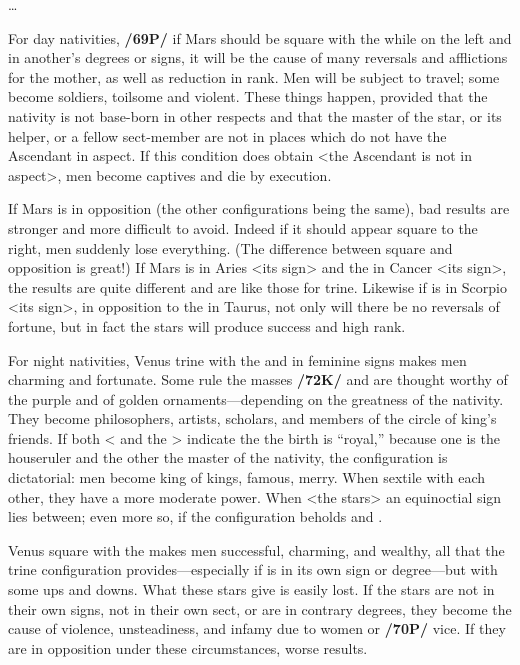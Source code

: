 \ldots

For day nativities, \textbf{/69P/} if Mars \marginnote{\Mars \Square \Moon} should be square with the \Moon\xspace while on the left and in another’s degrees or signs, it will be the cause of many reversals and afflictions for the mother, as well as reduction in rank. Men will be subject to travel; some become soldiers, toilsome and violent. These things happen, provided that the nativity is not base-born in other respects and that the master of the star, or its helper, or a fellow sect-member are not in places which do not have the Ascendant in aspect. If this condition does obtain <the Ascendant is not in aspect>, men become captives and die by execution. 

If Mars is in opposition (the other configurations being the same), bad results are stronger and more difficult to avoid. Indeed if it should appear square to the right, men suddenly lose everything. (The difference between square and opposition is great!) \mndl If Mars is in Aries <its sign> and the \Moon\xspace in Cancer <its sign>, the results are quite different and are like those for trine. Likewise if \Mars\xspace is in Scorpio <its sign>, in opposition to the \Moon\xspace in Taurus, not only will there be no reversals of fortune, but in fact the stars will produce success and high rank.

For night nativities, Venus \marginnote{\Venus \Trine \Moon} trine with the \Moon\xspace and in feminine signs makes men charming and fortunate. Some rule the masses \textbf{/72K/} and are thought worthy of the purple and of golden ornaments—depending on the greatness of the nativity. They become philosophers, artists, scholars, and members of
the circle of king’s friends. If both <\Venus\xspace and the \Moon> indicate the the birth is “royal,” because one is
the houseruler and the other the master of the nativity, the configuration is dictatorial: men become king of kings, famous, merry. When sextile with each other, they have a more moderate power. When <the stars> an equinoctial sign lies between; even more so, if the configuration beholds \Pisces\xspace and \Taurus.

Venus \marginnote{\Venus \Square \Moon} square with the \Moon\xspace makes men successful, charming, and wealthy, all that the trine configuration provides—especially if \Venus\xspace is in its own sign or degree—but with some ups and downs. \mndl What these stars give is easily lost. If the stars are not in their own signs, not in their own sect, or are in contrary degrees, they become the cause of violence, unsteadiness, and infamy due to women or \textbf{/70P/} vice.
If they are in opposition under these circumstances, worse results.

